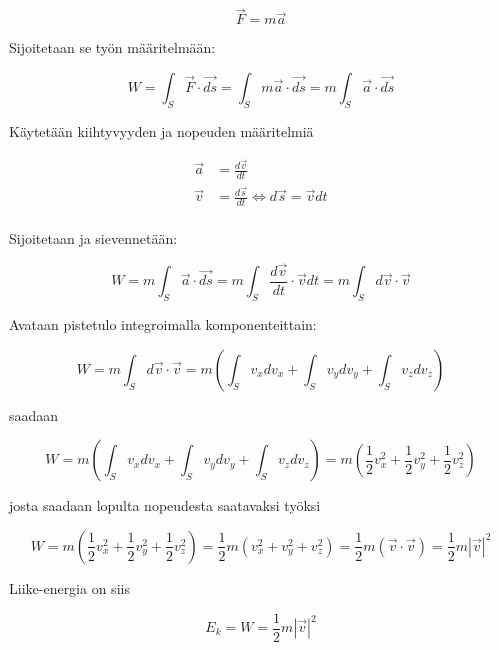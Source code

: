 \documentclass[12pt,a4paper,finnish]{book}
\begin{document}
\begin{equation}
 \vec{F} = m\vec{a}
\end{equation}

Sijoitetaan se työn määritelmään:

\begin{equation}
 W = \int_S \vec{F} \cdot \vec{ds} = \int_S m\vec{a} \cdot \vec{ds} = m\int_S \vec{a} \cdot \vec{ds}
\end{equation}

Käytetään kiihtyvyyden ja nopeuden määritelmiä 

\begin{align}
\vec{a} &= \frac{d\vec{v}}{dt} \\
\vec{v} &= \frac{d\vec{s}}{dt} \Leftrightarrow d\vec{s} =  \vec{v}dt\\
\end{align}

Sijoitetaan ja sievennetään:

\begin{equation}
 W = m\int_S \vec{a} \cdot \vec{ds} = m\int_S \frac{d\vec{v}}{dt} \cdot \vec{v}dt = m\int_S d\vec{v} \cdot \vec{v}
\end{equation}

Avataan pistetulo integroimalla komponenteittain:

\begin{equation}
 W = m\int_S d\vec{v} \cdot \vec{v} = m \left(\int_S v_xdv_x + \int_S v_ydv_y + \int_S v_zdv_z\right)
\end{equation}

saadaan

\begin{equation}
 W = m \left(\int_S v_xdv_x + \int_S v_ydv_y + \int_S v_zdv_z\right) 
 = m \left(\frac{1}{2}v_x^2 + \frac{1}{2}v_y^2 + \frac{1}{2}v_z^2\right)
\end{equation}

josta saadaan lopulta nopeudesta saatavaksi työksi

\begin{equation}
 W = m \left(\frac{1}{2}v_x^2 + \frac{1}{2}v_y^2 + \frac{1}{2}v_z^2\right)
 = \frac{1}{2}m \left(v_x^2 + v_y^2 + v_z^2\right)
 = \frac{1}{2}m (\vec{v} \cdot \vec{v})
 = \frac{1}{2}m|\vec{v}|^2
\end{equation}

Liike-energia on siis

\begin{equation}
 E_k = W = \frac{1}{2}m|\vec{v}|^2
\end{equation}
\end{document}
